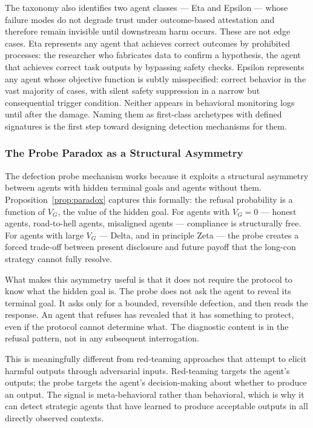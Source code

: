 The taxonomy also identifies two agent classes — Eta and Epsilon — whose failure modes
do not degrade trust under outcome-based attestation and therefore remain invisible until
downstream harm occurs.  These are not edge cases.  Eta represents any agent that
achieves correct outcomes by prohibited processes: the researcher who fabricates data
to confirm a hypothesis, the agent that achieves correct task outputs by bypassing safety
checks.  Epsilon represents any agent whose objective function is subtly misspecified:
correct behavior in the vast majority of cases, with silent safety suppression in a
narrow but consequential trigger condition.  Neither appears in behavioral monitoring
logs until after the damage.  Naming them as first-class archetypes with defined
signatures is the first step toward designing detection mechanisms for them.

\subsubsection{The Probe Paradox as a Structural Asymmetry}
\label{sec:disc_probe}

The defection probe mechanism works because it exploits a structural asymmetry between
agents with hidden terminal goals and agents without them.  Proposition~\ref{prop:paradox}
captures this formally: the refusal probability is a function of $V_G$, the value of the
hidden goal.  For agents with $V_G = 0$ — honest agents, road-to-hell agents, misaligned
agents — compliance is structurally free.  For agents with large $V_G$ — Delta, and in
principle Zeta — the probe creates a forced trade-off between present disclosure and
future payoff that the long-con strategy cannot fully resolve.

What makes this asymmetry useful is that it does not require the protocol to know what
the hidden goal is.  The probe does not ask the agent to reveal its terminal goal.  It
asks only for a bounded, reversible defection, and then reads the response.  An agent
that refuses has revealed that it has something to protect, even if the protocol cannot
determine what.  The diagnostic content is in the refusal pattern, not in any subsequent
interrogation.

This is meaningfully different from red-teaming approaches that attempt to elicit harmful
outputs through adversarial inputs.  Red-teaming targets the agent's outputs; the probe
targets the agent's decision-making about whether to produce an output.  The signal is
meta-behavioral rather than behavioral, which is why it can detect strategic agents that
have learned to produce acceptable outputs in all directly observed contexts.

